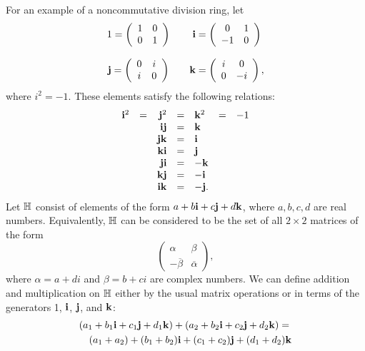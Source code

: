  
For an example of a noncommutative division ring, let
\[
\begin{array}{ccc}
1 = 
\left(
\begin{array}{cc}
1 & 0 \\
0 & 1
\end{array}
\right)
& &
{\bold i}
=
\left(
\begin{array}{cc}
0 & 1 \\
-1 & 0
\end{array}
\right)
\\ & & \\
{\bold j} =
\left(
\begin{array}{cc}
0 & i \\
i & 0
\end{array}
\right)
& &
{\bold k} = 
\left(
\begin{array}{cc}
i & 0 \\
0 & -i
\end{array}
\right),
\end{array}
\]
where $i^2 = -1$. These elements satisfy the following relations: 
\[
\begin{array}{ccrclcc}
{\bold i}^2 & = & {\bold j}^2 & = &  {\bold k}^2 & = & -1 \\
& & {\bold i}  {\bold j} & = &  {\bold k} && \\
& & {\bold j}  {\bold k} & = &  {\bold i} && \\
& & {\bold k}  {\bold i} & = &  {\bold j} && \\
& & {\bold j}  {\bold i} & = &  - {\bold k} && \\
& & {\bold k}  {\bold j} & = &  - {\bold i} && \\
& & {\bold i}  {\bold k} & = &  - {\bold j}. &&
\end{array}
\]
Let ${\Bbb H}$\label{noteringH} consist of elements of the form $a + b
{\bold i}  + c {\bold j} +d {\bold k}$, where $a, b , c, d$ are real
numbers. Equivalently, ${\Bbb H}$ can be considered to be the set of
all $2 \times 2$ matrices of the form  
\[
\left(
\begin{array}{cc}
\alpha & \beta \\
-\overline{\beta} & \overline{\alpha }
\end{array}
\right),
\]
where $\alpha = a + di$ and $\beta = b+ci$ are complex numbers. We can
define addition and multiplication on ${\Bbb H}$ either by the usual matrix
operations or in terms of the generators 1, ${\bold i}$, ${\bold j}$,
and ${\bold k}$: 
\begin{eqnarray*}
\lefteqn{ (a_1 + b_1 {\bold i}  + c_1 {\bold j} +d_1 {\bold k} )
+ ( a_2 + b_2 {\bold i}  + c_2 {\bold j} +d_2 {\bold k} )
= } \\
& & (a_1 + a_2) + ( b_1 + b_2) {\bold i}  + ( c_1 + c_2)
{\bold j} + ( d_1 + d_2) {\bold k}
\end{eqnarray*}
